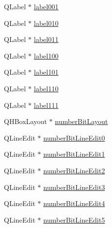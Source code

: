 \begin{DoxyCompactItemize}
\item 
Q\+Label $\ast$ \mbox{\hyperlink{class_ui___config_elementary_automaton_window_ae6ddcbaf9c1e0fad175d3a1c4e7271ba}{label001}}
\item 
Q\+Label $\ast$ \mbox{\hyperlink{class_ui___config_elementary_automaton_window_a4eeae3ea9288dcedcda164287e3a10c8}{label010}}
\item 
Q\+Label $\ast$ \mbox{\hyperlink{class_ui___config_elementary_automaton_window_ad2a2dd9495f66974785f79efb49adc62}{label011}}
\item 
Q\+Label $\ast$ \mbox{\hyperlink{class_ui___config_elementary_automaton_window_aa658418178fd84926d88de91255d4cc9}{label100}}
\item 
Q\+Label $\ast$ \mbox{\hyperlink{class_ui___config_elementary_automaton_window_a1b23a36ac18dae71f0d1d802e1f6390d}{label101}}
\item 
Q\+Label $\ast$ \mbox{\hyperlink{class_ui___config_elementary_automaton_window_a2d14e7d75278aeb80c23058e823c38ff}{label110}}
\item 
Q\+Label $\ast$ \mbox{\hyperlink{class_ui___config_elementary_automaton_window_ad08ac4a3f395648e2b9738626e5ec226}{label111}}
\item 
Q\+H\+Box\+Layout $\ast$ \mbox{\hyperlink{class_ui___config_elementary_automaton_window_ae610f2443811ecdbe4f494b544971b39}{number\+Bit\+Layout}}
\item 
Q\+Line\+Edit $\ast$ \mbox{\hyperlink{class_ui___config_elementary_automaton_window_adaf3d661fccfe52d0773ab85cadb204b}{number\+Bit\+Line\+Edit0}}
\item 
Q\+Line\+Edit $\ast$ \mbox{\hyperlink{class_ui___config_elementary_automaton_window_a475eac5dfbfe219878e5f277d1d388f6}{number\+Bit\+Line\+Edit1}}
\item 
Q\+Line\+Edit $\ast$ \mbox{\hyperlink{class_ui___config_elementary_automaton_window_aa9f659b56d9c3393a3b175d094c91ec3}{number\+Bit\+Line\+Edit2}}
\item 
Q\+Line\+Edit $\ast$ \mbox{\hyperlink{class_ui___config_elementary_automaton_window_af5bbb149af499cee89c630610f0e59cb}{number\+Bit\+Line\+Edit3}}
\item 
Q\+Line\+Edit $\ast$ \mbox{\hyperlink{class_ui___config_elementary_automaton_window_acb6ec9a99a2008358cf85f85694ea121}{number\+Bit\+Line\+Edit4}}
\item 
Q\+Line\+Edit $\ast$ \mbox{\hyperlink{class_ui___config_elementary_automaton_window_aedb508e244a27141af2bc0c346f8bcd8}{number\+Bit\+Line\+Edit5}}
\item 

\end{DoxyCompactItemize}

